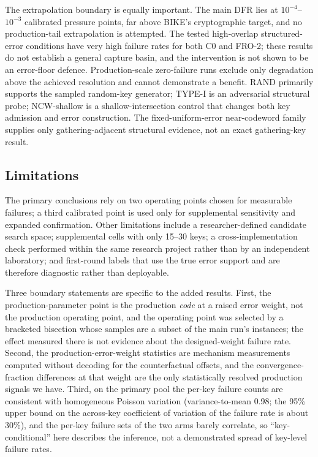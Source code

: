 \documentclass[lettersize,journal]{IEEEtran}
\begin{document}
The extrapolation boundary is equally important. The main DFR lies at $10^{-4}$--$10^{-3}$ calibrated pressure points, far above BIKE's cryptographic target, and no production-tail extrapolation is attempted. The tested high-overlap structured-error conditions have very high failure rates for both C0 and FRO-2; these results do not establish a general capture basin, and the intervention is not shown to be an error-floor defence. Production-scale zero-failure runs exclude only degradation above the achieved resolution and cannot demonstrate a benefit. RAND primarily supports the sampled random-key generator; TYPE-I is an adversarial structural probe; NCW-shallow is a shallow-intersection control that changes both key admission and error construction. The fixed-uniform-error near-codeword family supplies only gathering-adjacent structural evidence, not an exact gathering-key result.

\subsection{Limitations}

The primary conclusions rely on two operating points chosen for measurable failures; a third calibrated point is used only for supplemental sensitivity and expanded confirmation. Other limitations include a researcher-defined candidate search space; supplemental cells with only 15--30 keys; a cross-implementation check performed within the same research project rather than by an independent laboratory; and first-round labels that use the true error support and are therefore diagnostic rather than deployable.

Three boundary statements are specific to the added results. First, the production-parameter point is the production \emph{code} at a raised error weight, not the production operating point, and the operating point was selected by a bracketed bisection whose samples are a subset of the main run's instances; the effect measured there is not evidence about the designed-weight failure rate. Second, the production-error-weight statistics are mechanism measurements computed without decoding for the counterfactual offsets, and the convergence-fraction differences at that weight are the only statistically resolved production signals we have. Third, on the primary pool the per-key failure counts are consistent with homogeneous Poisson variation (variance-to-mean 0.98; the 95\% upper bound on the across-key coefficient of variation of the failure rate is about 30\%), and the per-key failure sets of the two arms barely correlate, so ``key-conditional'' here describes the inference, not a demonstrated spread of key-level failure rates.
\end{document}
